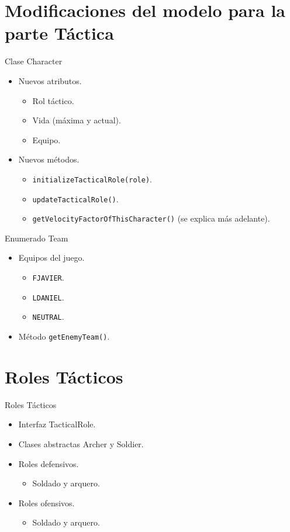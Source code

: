 \documentclass[10pt]{beamer}
\begin{document}
\section{Modificaciones del modelo para la parte Táctica}
\begin{frame}{Clase Character}
\begin{itemize}[<+- | alert@+>]
	\item Nuevos atributos.
	\begin{itemize}[<+- | alert@+>]
  		\item Rol táctico.
  		\item Vida (máxima y actual).
  		\item Equipo.
 	\end{itemize}
	\item Nuevos métodos.
	\begin{itemize}[<+- | alert@+>]
  		\item \texttt{initializeTacticalRole(role)}.
  		\item \texttt{updateTacticalRole()}.
  		\item \texttt{getVelocityFactorOfThisCharacter()} (se explica más adelante).
 	\end{itemize}
\end{itemize}
\end{frame}

\begin{frame}{Enumerado Team}
\begin{itemize}[<+- | alert@+>]
	\item Equipos del juego.
	\begin{itemize}[<+- | alert@+>]
  		\item \texttt{FJAVIER}.
  		\item \texttt{LDANIEL}.
  		\item \texttt{NEUTRAL}.
 	\end{itemize}
	\item Método \texttt{getEnemyTeam()}.
\end{itemize}
\end{frame}

\section{Roles Tácticos}
\begin{frame}{Roles Tácticos}
\begin{itemize}[<+- | alert@+>]
	\item Interfaz TacticalRole.
	\item Clases abstractas Archer y Soldier.
	\item Roles defensivos.
	\begin{itemize}[<+- | alert@+>]
  		\item Soldado y arquero.
 	\end{itemize}
 	\item Roles ofensivos.
	\begin{itemize}[<+- | alert@+>]
  		\item Soldado y arquero.
 	\end{itemize}
\end{itemize}
\end{frame}
\end{document}
